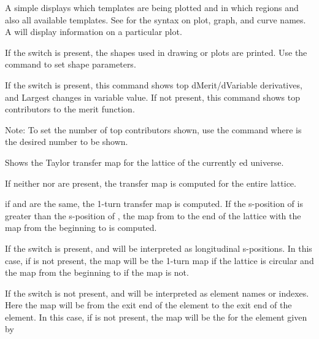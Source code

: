 {{{\begin{description}
{{A simple  displays which templates are being plotted and
in which regions and also all available templates. See
 for the syntax on plot, graph, and curve names. A
 will display information on a particular
plot. 

If the  switch is present, the shapes used in drawing 
 or  plots are printed. Use the 
command to set shape parameters.


\item[show top10 \{-derivative\}] \Newline
If the  switch is present, this command shows top
dMerit/dVariable derivatives, and Largest changes in variable value.
If not present, this command
shows top contributors to the merit function.

Note: To set the number of top contributors shown, use the command
 where  is the desired number to
be shown.


\item[show taylor\_map \{-order <n\_order>\} \{-s\} \{loc1 \{loc2\}\}] \Newline

Shows the Taylor transfer map for the  lattice of the
currently ed universe.

If neither  nor  are present, the transfer map is
computed for the entire lattice.

if  and  are the same, the 1-turn transfer map is
computed. If the s-position of  is greater than the
s-position of , the map from  to the end of the
lattice with the map from the beginning to  is computed.

If the  switch is present,  and  will be
interpreted as longitudinal s-positions. In this case, if  is
not present, the map will be the 1-turn map if the lattice is circular
and the map from the beginning to  if the map is not.

If the  switch is not present,  and  will be
interpreted as element names or indexes. Here the map will be from the
exit end of the  element to the exit end of the 
element. In this case, if  is not present, the map will be
the for the element given by 

}}
\end{description}}}}
